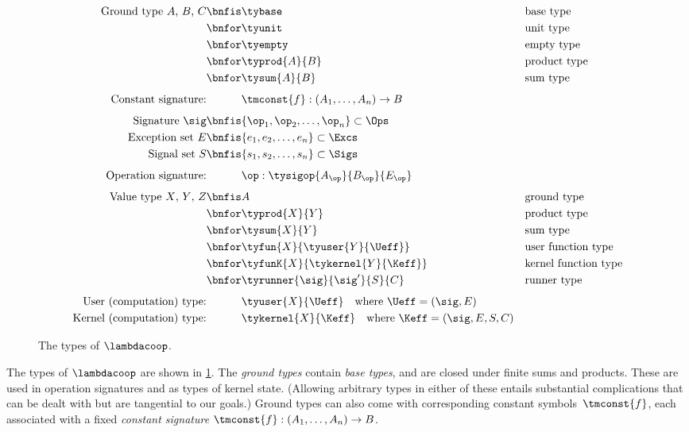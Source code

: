 \begin{figure}[tb]
  \parbox{\textwidth}{
  \centering
  \small
  \begin{align*}
  \text{Ground type $A$, $B$, $C$}
  \bnfis& \tybase      & &\text{base type} \\
  \bnfor& \tyunit       & &\text{unit type} \\
  \bnfor& \tyempty      & &\text{empty type} \\
  \bnfor& \typrod{A}{B} & &\text{product type} \\
  \bnfor& \tysum{A}{B}  & &\text{sum type}
  \\[1ex]
  \text{Constant signature:}
  \phantom{\bnfis}& \tmconst{f} : (A_1,\ldots,A_n) \to B
  \\[1ex]
  \text{Signature $\sig$}
  \bnfis& \{\op_1, \op_2, \ldots, \op_n\} \subset \Ops
  \\
  \text{Exception set $E$}
  \bnfis& \{e_1, e_2, \ldots, e_n\} \subset \Excs
  \\
  \text{Signal set $S$}
  \bnfis& \{s_1, s_2, \ldots, s_n\} \subset \Sigs
  \\[1ex]
  \text{Operation signature:}
  \phantom{\bnfis}& \op : \tysigop{A_\op}{B_\op}{E_\op}
  \\[1ex]
  \text{Value type $X$, $Y$, $Z$}
  \bnfis& A                                       & &\text{ground type} \\
  \bnfor& \typrod{X}{Y}                           & &\text{product type} \\
  \bnfor& \tysum{X}{Y}                            & &\text{sum type} \\
  \bnfor& \tyfun{X}{\tyuser{Y}{\Ueff}}           & &\text{user function type} \\
  \bnfor& \tyfunK{X}{\tykernel{Y}{\Keff}}         & &\text{kernel function type} \\
  \bnfor& \tyrunner{\sig}{\sig'}{S}{C}      & &\text{runner type}
  \\[1ex]
  \text{User (computation) type:}
  \phantom{\bnfor} &\tyuser{X}{\Ueff} \quad \text{where $\Ueff = (\sig, E)$}
  \\
  \text{Kernel (computation) type:}
  \phantom{\bnfor}& \tykernel{X}{\Keff} \quad \text{where $\Keff = (\sig, E, S, C)$}
  \end{align*}
  } 
  \caption{The types of $\lambdacoop$.}
  \label{fig:lambdacoop-types}
\end{figure}

The types of $\lambdacoop$ are shown in \cref{fig:lambdacoop-types}.
%
The \emph{ground types} contain \emph{base types}, and are closed under finite sums and
products. These are used in operation signatures and as types of kernel state. (Allowing
arbitrary types in either of these entails substantial complications that can be dealt
with but are tangential to our goals.) Ground types can also come with corresponding 
constant symbols~$\tmconst{f}$, each associated with a fixed \emph{constant signature}
$\tmconst{f} : (A_1,\ldots,A_n) \to B$.

